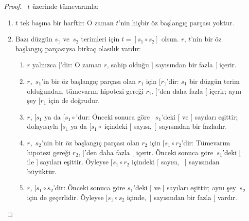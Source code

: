 \begin{proof}
  ~$t$ üzerinde tümevarımla:
  \begin{enumerate}
  \item $t$ tek başına bir harftir: O zaman $t$'nin hiçbir öz başlangıç
    parçası yoktur.
  \item Bazı düzgün $s_1$ ve~$s_2$ terimleri için $t = [s_1 \circ
    s_2]$ olsun. $r$, $t$'nin bir öz başlangıç parçasıysa birkaç olasılık
    vardır:
    \begin{enumerate}
    \item $r$ yalnızca $[$'dir: O zaman $r$, sahip olduğu $]$ sayısından
      bir fazla $[$ içerir.
    \item $r$,~$s_1$'in bir öz başlangıç parçası olan $r_1$ için
      $[r_1$'dir: $s_1$ bir düzgün terim olduğundan, tümevarım hipotezi
      gereği $r_1$, $]$'den daha fazla $[$ içerir; aynı şey $[r_1$ için
      de doğrudur.
    \item $r$, $[s_1$ ya da $[s_1 \circ {}$'dur: Önceki sonuca göre
      ~$s_1$'deki $[$ ve $]$ sayıları eşittir; dolayısıyla $[s_1$ ya da
      $[s_1 \circ {}$ içindeki $[$ sayısı,~$]$ sayısından bir fazladır.
    \item $r$,~$s_2$'nin bir öz başlangıç parçası olan $r_2$ için
      $[s_1 \circ r_2$'dir: Tümevarım hipotezi gereği $r_2$, $]$'den daha
      fazla $[$ içerir. Önceki sonuca göre~$s_1$'deki $[$ ile $]$
      sayıları eşittir. Öyleyse $[s_1 \circ r_2$ içindeki $[$ sayısı,
      ~$]$ sayısından büyüktür.
    \item $r$, $[s_1 \circ s_2$'dir: Önceki sonuca göre $s_1$'deki $[$
      ve $]$ sayıları eşittir; aynı şey~$s_2$ için de geçerlidir. Öyleyse
      $[s_1 \circ s_2$ içinde,~$]$ sayısından bir fazla $[$ vardır.
    \end{enumerate}
  \end{enumerate}
\end{proof}

